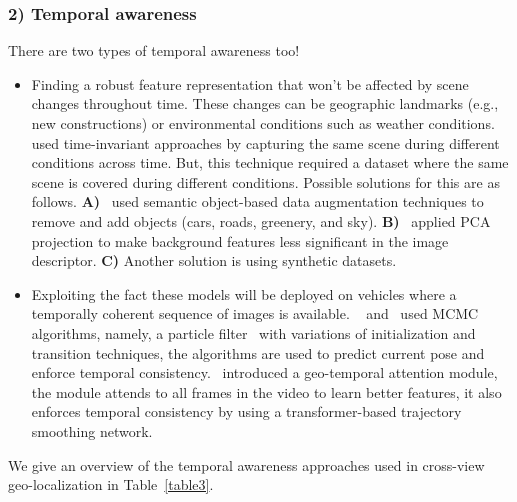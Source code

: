 \documentclass[10pt,letterpaper]{article}
\begin{document}
\subsubsection*{2) Temporal awareness}
There are two types of temporal awareness too!
\begin{itemize}
  \item Finding a robust feature representation that won’t be affected by scene changes throughout time. These changes can be geographic landmarks (e.g., new constructions) or environmental conditions such as weather conditions.
  ~\cite{bib6,bib54} used time-invariant approaches by capturing the same scene during different conditions across time. But, this technique required a dataset where the same scene is covered during different conditions. Possible solutions for this are as follows. {\bf A)}~\cite{bib8} used semantic object-based data augmentation techniques to remove and add objects (cars, roads, greenery, and sky). {\bf B)}~\cite{bib7} applied PCA projection to make background features less significant in the image descriptor. {\bf C)} Another solution is using synthetic datasets.
  \item Exploiting the fact these models will be deployed on vehicles where a temporally coherent sequence of images is available.
  ~\cite{bib7} and~\cite{bib20,bib21,bib22} used MCMC algorithms, namely, a particle filter~\cite{bib45} with variations of initialization and transition techniques, the algorithms are used to predict current pose and enforce temporal consistency.~\cite{bib24} introduced a geo-temporal attention module, the module attends to all frames in the video to learn better features, it also enforces temporal consistency by using a transformer-based trajectory smoothing network.
\end{itemize}
We give an overview of the temporal awareness approaches used in cross-view geo-localization in Table~\ref{table3}.

\begin{table}[!ht]
  \centering
  \caption{
  {\bf An overview of the temporal awareness approaches used in cross-view geo-localization.}}
  \label{table3}
\end{table}
\end{document}
